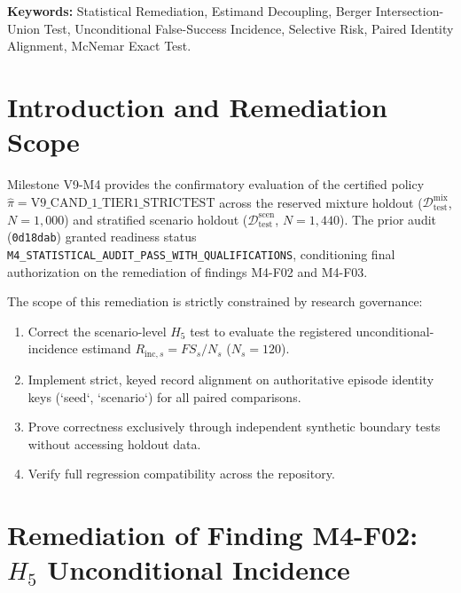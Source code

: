 \documentclass[10pt,a4paper]{article}
\begin{document}
\vspace{6pt}
\noindent \textbf{Keywords:} Statistical Remediation, Estimand Decoupling, Berger Intersection-Union Test, Unconditional False-Success Incidence, Selective Risk, Paired Identity Alignment, McNemar Exact Test.

\section{Introduction and Remediation Scope}
Milestone V9-M4 provides the confirmatory evaluation of the certified policy $\hat{\pi} = \text{V9\_CAND\_1\_TIER1\_STRICTEST}$ across the reserved mixture holdout ($\mathcal{D}_{\mathrm{test}}^{\mathrm{mix}}$, $N = 1,000$) and stratified scenario holdout ($\mathcal{D}_{\mathrm{test}}^{\mathrm{scen}}$, $N = 1,440$). The prior audit (\texttt{0d18dab}) granted readiness status \texttt{M4\_STATISTICAL\_AUDIT\_PASS\_WITH\_QUALIFICATIONS}, conditioning final authorization on the remediation of findings M4-F02 and M4-F03. 

The scope of this remediation is strictly constrained by research governance:
\begin{enumerate}
    \item Correct the scenario-level $H_5$ test to evaluate the registered unconditional-incidence estimand $R_{\mathrm{inc}, s} = FS_s / N_s$ ($N_s = 120$).
    \item Implement strict, keyed record alignment on authoritative episode identity keys (`seed`, `scenario`) for all paired comparisons.
    \item Prove correctness exclusively through independent synthetic boundary tests without accessing holdout data.
    \item Verify full regression compatibility across the repository.
\end{enumerate}

\section{Remediation of Finding M4-F02: $H_5$ Unconditional Incidence}
\end{document}
